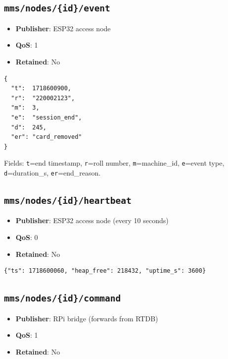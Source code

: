 \subsection{\texttt{mms/nodes/\{id\}/event}}
\begin{itemize}[leftmargin=1.5em,noitemsep]
    \item \textbf{Publisher}: ESP32 access node
    \item \textbf{QoS}: 1
    \item \textbf{Retained}: No
\end{itemize}

\begin{lstlisting}[style=jsonlstyle,caption={Event topic payload}]
{
  "t":  1718600900,
  "r":  "220002123",
  "m":  3,
  "e":  "session_end",
  "d":  245,
  "er": "card_removed"
}
\end{lstlisting}

Fields: \texttt{t}=end timestamp, \texttt{r}=roll number, \texttt{m}=machine\_id, \texttt{e}=event type, \texttt{d}=duration\_s, \texttt{er}=end\_reason.

\subsection{\texttt{mms/nodes/\{id\}/heartbeat}}
\begin{itemize}[leftmargin=1.5em,noitemsep]
    \item \textbf{Publisher}: ESP32 access node (every 10 seconds)
    \item \textbf{QoS}: 0
    \item \textbf{Retained}: No
\end{itemize}

\begin{lstlisting}[style=jsonlstyle,caption={Heartbeat topic payload}]
{"ts": 1718600060, "heap_free": 218432, "uptime_s": 3600}
\end{lstlisting}

\subsection{\texttt{mms/nodes/\{id\}/command}}
\begin{itemize}[leftmargin=1.5em,noitemsep]
    \item \textbf{Publisher}: RPi bridge (forwards from RTDB)
    \item \textbf{QoS}: 1
    \item \textbf{Retained}: No
\end{itemize}

